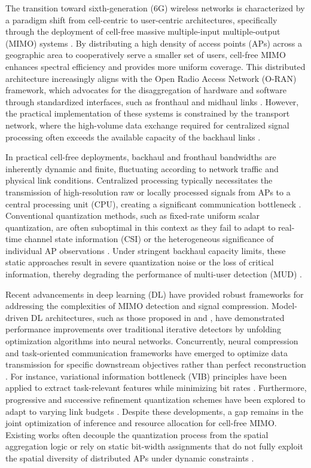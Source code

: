 The transition toward sixth-generation (6G) wireless networks is characterized by a paradigm shift from cell-centric to user-centric architectures, specifically through the deployment of cell-free massive multiple-input multiple-output (MIMO) systems \cite{bashar2019cell}. By distributing a high density of access points (APs) across a geographic area to cooperatively serve a smaller set of users, cell-free MIMO enhances spectral efficiency and provides more uniform coverage. This distributed architecture increasingly aligns with the Open Radio Access Network (O-RAN) framework, which advocates for the disaggregation of hardware and software through standardized interfaces, such as fronthaul and midhaul links \cite{femenias2020fronthaul}. However, the practical implementation of these systems is constrained by the transport network, where the high-volume data exchange required for centralized signal processing often exceeds the available capacity of the backhaul links \cite{kassab2019non}.

In practical cell-free deployments, backhaul and fronthaul bandwidths are inherently dynamic and finite, fluctuating according to network traffic and physical link conditions. Centralized processing typically necessitates the transmission of high-resolution raw or locally processed signals from APs to a central processing unit (CPU), creating a significant communication bottleneck \cite{liu2015joint}. Conventional quantization methods, such as fixed-rate uniform scalar quantization, are often suboptimal in this context as they fail to adapt to real-time channel state information (CSI) or the heterogeneous significance of individual AP observations \cite{park2013multihop}. Under stringent backhaul capacity limits, these static approaches result in severe quantization noise or the loss of critical information, thereby degrading the performance of multi-user detection (MUD) \cite{zhou2016fronthaul}.

Recent advancements in deep learning (DL) have provided robust frameworks for addressing the complexities of MIMO detection and signal compression. Model-driven DL architectures, such as those proposed in \cite{he2020model} and \cite{wei2020learned}, have demonstrated performance improvements over traditional iterative detectors by unfolding optimization algorithms into neural networks. Concurrently, neural compression and task-oriented communication frameworks have emerged to optimize data transmission for specific downstream objectives rather than perfect reconstruction \cite{shao2021task, bian2025towards}. For instance, variational information bottleneck (VIB) principles have been applied to extract task-relevant features while minimizing bit rates \cite{charvin2023exact}. Furthermore, progressive and successive refinement quantization schemes have been explored to adapt to varying link budgets \cite{sohrabi2022learning, fishel2025remote}. Despite these developments, a gap remains in the joint optimization of inference and resource allocation for cell-free MIMO. Existing works often decouple the quantization process from the spatial aggregation logic or rely on static bit-width assignments that do not fully exploit the spatial diversity of distributed APs under dynamic constraints \cite{qiao2024meta}.

